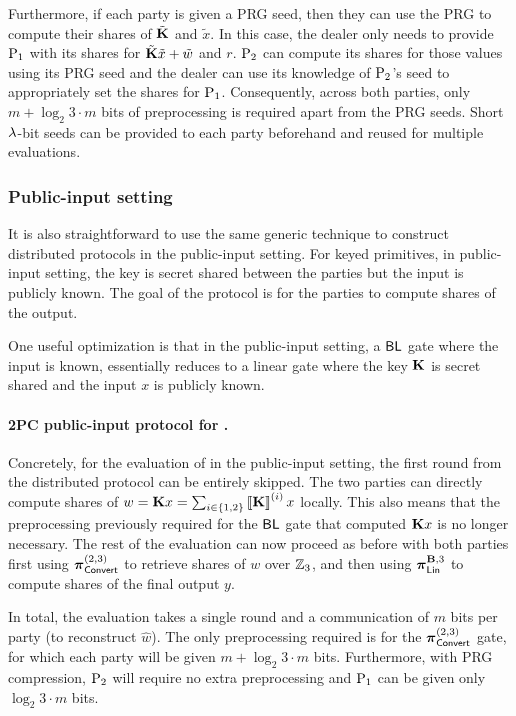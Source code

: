Furthermore, if each party is given a PRG seed, then they can use the PRG to compute their shares of $\tilde{\mat{K}}$ and $\tilde{x}$. In this case, the dealer only needs to provide $\textnormal{P}_1$ with its shares for $\tilde{\mat{K}}\tilde{x} + \tilde{w}$ and $r$. $\textnormal{P}_2$ can compute its shares for those values using its PRG seed and the dealer can use its knowledge of $\textnormal{P}_2$'s seed to appropriately set the shares for $\textnormal{P}_1$. Consequently, across both parties, only $m + \log_2{3} \cdot m$ bits of preprocessing is required apart from the PRG seeds. Short $\lambda$-bit seeds can be provided to each party beforehand and reused for multiple evaluations. 


\subsubsection{Public-input setting}
It is also straightforward to use the same generic technique to construct distributed protocols in the public-input setting. For keyed primitives, in public-input setting, the key is secret shared between the parties but the input is publicly known. The goal of the protocol is for the parties to compute shares of the output.

One useful optimization is that in the public-input setting, a $\textnormal{\textsf{BL}}$ gate where the input is known, essentially reduces to a linear gate where the key $\mat{K}$ is secret shared and the input $x$ is publicly known.

\paragraph{2PC public-input protocol for \ttwPRF.}
Concretely, for the evaluation of \ttwPRF in the public-input setting, the first round from the distributed protocol can be entirely skipped. The two parties can directly compute shares of $w = \mat{K}x = \sum_{i \in \{1,2\}} \sharei{\mat{K}}x$ locally. This also means that the preprocessing previously required for the $\textnormal{\textsf{BL}}$ gate that computed $\mat{K}x$ is no longer necessary. The rest of the evaluation can now proceed as before with both parties first using $\boldsymbol{\pi}_{\textnormal{\textsf{Convert}}}^{(2,3)}$ to retrieve shares of $w$ over $\mathbb{Z}_3$, and then using $\prot_\LMap^{\mat{B},3}$ to compute shares of the final output $y$.

In total, the evaluation takes a single round and a communication of $m$ bits per party (to reconstruct $\hat{w}$). The only preprocessing required is for the $\boldsymbol{\pi}_{\textnormal{\textsf{Convert}}}^{(2,3)}$ gate, for which each party will be given $m + \log_2{3} \cdot m$ bits. Furthermore, with PRG compression, $\textnormal{P}_2$ will require no extra preprocessing and $\textnormal{P}_1$ can be given only $\log_2{3} \cdot m$ bits.



